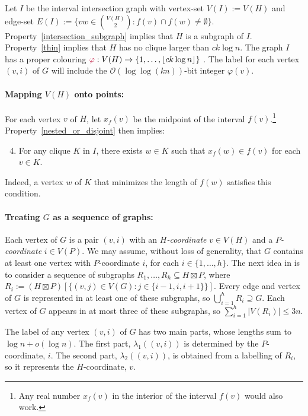 \documentclass{patmorin}
\makeatletter
\renewcommand{\le}{\leqslant}
\newcommand{\defin}[1]{\emph{\textcolor{brightmaroon}{#1}}}
\def\mathcolor#1#{\@mathcolor{#1}}
\def\@mathcolor#1#2#3{%
  \protect\leavevmode
  \begingroup
    \color#1{#2}#3%
  \endgroup
}
\newcommand{\mathdefin}[1]{\mathcolor{brightmaroon}{#1}}
\newcommand{\Oh}{\mathcal{O}}
\makeatother
\begin{document}
  Let $I$ be the interval intersection graph with vertex-set $V(I):=V(H)$ and edge-set $E(I):=\{vw\in\binom{V(H)}{2}:f(v)\cap f(w)\neq\emptyset\}$.
  Property~\ref{intersection_subgraph} implies that $H$ is a subgraph of $I$. Property~\ref{thin} implies that $H$ has no clique larger than $ck\log n$.
  The graph $I$ has a proper colouring $\mathdefin{\varphi}:V(H)\to\{1,\ldots,\lfloor ck\log n\rfloor\}$ \cite{gilmore.hoffman:characterization}.
  The label for each vertex $(v,i)$ of $G$ will include the $\Oh(\log\log (kn))$-bit integer $\varphi(v)$.

  \paragraph{\boldmath Mapping $V(H)$ onto points:}
  For each vertex $v$ of $H$, let $x_f(v)$ be the midpoint of the interval $f(v)$.\footnote{Any real number $x_f(v)$ in the interior of the interval $f(v)$ would also work.}  Property~\ref{nested_or_disjoint} then implies:
  \begin{enumerate}\setcounter{enumi}{3}
      \item\label{clique_property} For any clique $K$ in $I$, there exists $w\in K$ such that $x_f(w)\in f(v)$ for each $v\in K$.
  \end{enumerate}
  Indeed, a vertex $w$ of $K$ that minimizes the length of $f(w)$ satisfies this condition.

  \paragraph{\boldmath Treating $G$ as a sequence of graphs:}
  Each vertex of $G$ is a pair $(v,i)$ with an \defin{$H$-coordinate} $v\in V(H)$ and a \defin{$P$-coordinate} $i\in V(P)$.
  We may assume, without loss of generality, that $G$ contains at least one vertex with $P$-coordinate $i$, for each $i\in\{1,\ldots,h\}$.
  The next idea in \cite{dujmovic.esperet.ea:adjacency} is to consider a sequence of subgraphs $R_1,\ldots,R_h\subseteq H\boxtimes P$, where $R_i:=(H\boxtimes P)[\{(v,j)\in V(G):j\in\{i-1,i,i+1\}\}]$.
  Every edge and vertex of $G$ is represented in at least one of these subgraphs, so $\bigcup_{i=1}^h R_i\supseteq G$.
  Each vertex of $G$ appears in at most three of these subgraphs, so $\sum_{i=1}^h |V(R_i)|\le 3n$.

  The label of any vertex $(v,i)$ of $G$ has two main parts, whose lengths sum to $\log n+o(\log n)$.
  The first part, $\lambda_1((v,i))$ is determined by the $P$-coordinate, $i$.
  The second part, $\lambda_2((v,i))$, is obtained from a labelling of $R_i$, so it represents the $H$-coordinate, $v$.
\end{document}
